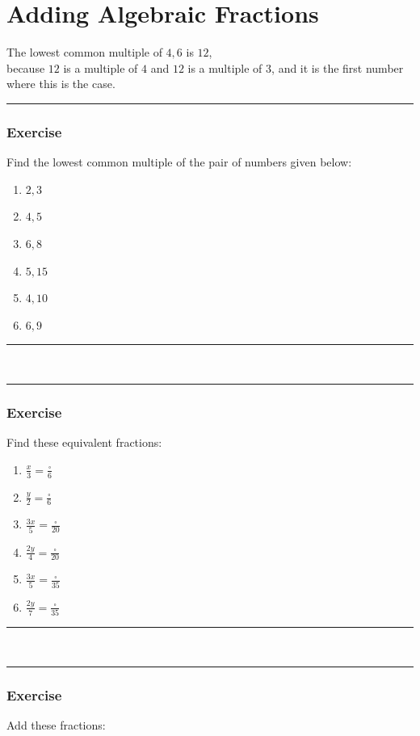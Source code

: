 \documentclass[a4paper,12pt]{article}
\newcommand\question{
	 \rule[0pt]{17cm}{0.5pt}\vspace{-0.5cm}
	\subsubsection{Exercise}

}
\newcommand\questionend{
	\rule[0pt]{17cm}{0.5pt}\vspace{0.0cm}\\
}
\begin{document}
\section{Adding Algebraic Fractions}
The lowest common multiple of $4, 6$ is $12$,\\ because $12$ is a multiple of $4$ and $12$ is a multiple of $3$, and it is the first number where this is the case.
\question
 Find the lowest common multiple of the pair of numbers given below:
\begin{multicols}{3}
	\begin{enumerate}[label=\normalsize \alph*)~~~ , topsep=8pt,itemsep=25pt,partopsep=4pt, parsep=4pt]
		\item $2, 3$
		\item $4,5$
		\item $6,8$
		\item $5,15$
		\item $4, 10$
		\item $6,9$
	\end{enumerate}
\end{multicols}\vspace{0cm}
\questionend
\question
Find these equivalent fractions:
\begin{multicols}{3}
	\begin{enumerate}[label=\normalsize \alph*)~~~ , topsep=8pt,itemsep=25pt,partopsep=4pt, parsep=4pt]
		\item $\displaystyle \frac{x}{3}=\frac{\square}{6}$
		\item $\displaystyle \frac{y}{2}=\frac{\square}{6}$
		\item $\displaystyle \frac{3x}{5}=\frac{\square}{20}$
		\item $\displaystyle \frac{2y}{4}=\frac{\square}{20}$
		\item $\displaystyle \frac{3x}{5}=\frac{\square}{35}$
		\item $\displaystyle \frac{2y}{7}=\frac{\square}{35}$
	\end{enumerate}
\end{multicols}\vspace{0cm}
\questionend
\question
Add these fractions:
\end{document}
